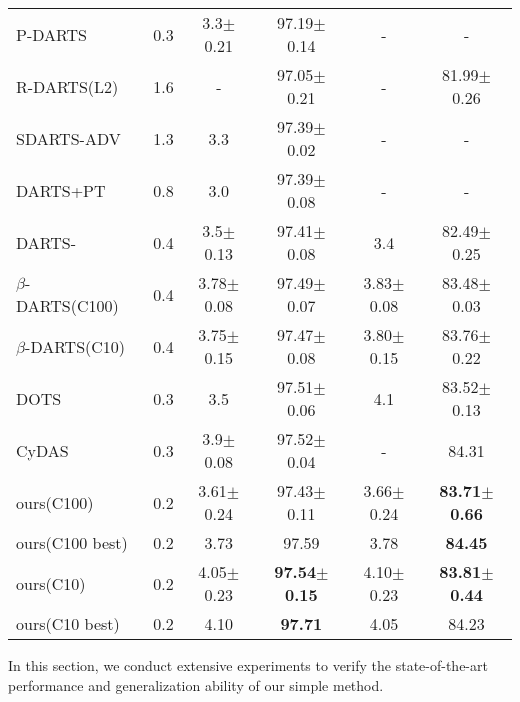 \documentclass[10pt,twocolumn,letterpaper]{article}
\begin{document}
\begin{table}
{\begin{tabular}{lccccc}
    \midrule
    P-DARTS~\cite{Chen_2019_pdarts}                & 0.3           & 3.3$\pm$0.21  & 97.19$\pm$0.14  & -             & -                 \\
    R-DARTS(L2)~\cite{Zela2020Understanding}            & 1.6           & -             & 97.05$\pm$0.21  & -             & 81.99$\pm$0.26    \\
    SDARTS-ADV~\cite{chen_2020_sdarts}             & 1.3           & 3.3           & 97.39$\pm$0.02  & -             & -                 \\
    DARTS+PT~\cite{wang_2021_rethinking}               & 0.8           & 3.0           & 97.39$\pm$0.08  & -             & -                 \\
    DARTS-~\cite{chu2021dartsminus}                 & 0.4           & 3.5$\pm$0.13  & 97.41$\pm$0.08  & 3.4           & 82.49$\pm$0.25    \\
    $\beta$-DARTS(C100)~\cite{ye_2022_beta}    & 0.4           & 3.78$\pm$0.08 & 97.49$\pm$0.07  & 3.83$\pm$0.08 & 83.48$\pm$0.03    \\
    $\beta$-DARTS(C10)~\cite{ye_2022_beta}     & 0.4           & 3.75$\pm$0.15 & 97.47$\pm$0.08  & 3.80$\pm$0.15 & 83.76$\pm$0.22    \\
    DOTS~\cite{Gu_2021_dots}                   & 0.3           & 3.5           & 97.51$\pm$0.06  & 4.1           & 83.52$\pm$0.13    \\
    CyDAS~\cite{Yu_2022_cdarts}                  & 0.3           & 3.9$\pm$0.08  & 97.52$\pm$0.04  & -             & 84.31              \\    
    \midrule
    ours(C100)             & 0.2           & 3.61$\pm$0.24 & 97.43$\pm$0.11  & 3.66$\pm$0.24 & \textbf{83.71$\pm$0.66} \\
    ours(C100 best)        & 0.2           & 3.73          & 97.59           & 3.78          & \textbf{84.45}                  \\  
    ours(C10)              & 0.2           & 4.05$\pm$0.23 & \textbf{97.54$\pm$0.15} & 4.10$\pm$0.23 & \textbf{83.81$\pm$0.44}  \\
    ours(C10 best)         & 0.2           & 4.10          & \textbf{97.71}            & 4.05          & 84.23              \\  
    \bottomrule
  \end{tabular}
  }
\label{tab:results_c10andc100}
\vspace{-6pt}
\end{table} In this section, we conduct extensive experiments to verify the state-of-the-art performance and generalization ability of our simple method.
\end{document}
